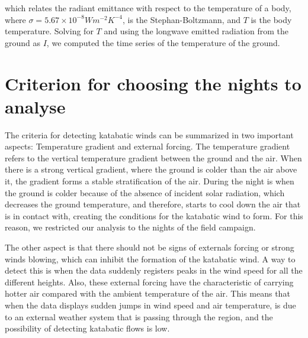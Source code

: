 \noindent which relates the radiant emittance with respect to the temperature of a body, where $\sigma = 5.67 \times 10^{-8} W m^{-2} K^{-4}$, is the Stephan-Boltzmann, and $T$ is the body temperature. Solving for $T$ and using the longwave emitted radiation from the ground as $I$, we computed the time series of the temperature of the ground.




\section{Criterion for choosing the nights to analyse}

The criteria for detecting katabatic winds can be summarized in two important aspects: Temperature gradient and external forcing. The temperature gradient refers to the vertical temperature gradient between the ground and the air. When there is a strong vertical gradient, where the ground is colder than the air above it, the gradient forms a stable stratification of the air. During the night is when the ground is colder because of the absence of incident solar radiation, which decreases the ground temperature, and therefore, starts to cool down the air that is in contact with, creating the conditions for the katabatic wind to form. For this reason, we restricted our analysis to the nights of the field campaign. 

The other aspect is that there should not be signs of externals forcing or strong winds blowing, which can inhibit the formation of the katabatic wind. A way to detect this is when the data suddenly registers peaks in the wind speed for all the different heights. Also, these external forcing have the characteristic of carrying hotter air compared with the ambient temperature of the air. This means that when the data displays sudden jumps in wind speed and air temperature, is due to an external weather system that is passing through the region, and the possibility of detecting katabatic flows is low.

